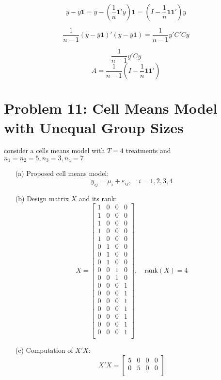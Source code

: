 \documentclass[10pt, oneside]{article}
\begin{document}
\[
	y - \bar{y}\mathbf{1} = y - \left( \frac{1}{n} \mathbf{1}'y \right)\mathbf{1} = \left( I - \frac{1}{n} \mathbf{1}\mathbf{1}' \right)y
\]

\[
	\frac{1}{n-1} (y - \bar{y}\mathbf{1})'(y - \bar{y}\mathbf{1}) = \frac{1}{n-1} y' C'C y
\]

\[
	\frac{1}{n-1} y' C y
\]
\[
	A = \frac{1}{n-1} \left( I - \frac{1}{n} \mathbf{1}\mathbf{1}' \right)
\]

\section*{Problem 11: Cell Means Model with Unequal Group Sizes}
consider a cells means model with $T=4$ treatments and $n_1=n_2=5,n_3=3,n_4=7$
\begin{itemize}
	\item[(a)] Proposed cell means model:
	      \[
		      y_{ij} = \mu_i + \varepsilon_{ij}, \quad i = 1, 2, 3, 4
	      \]
	\item[(b)] Design matrix $X$ and its rank:
	      \[
		      X = \begin{bmatrix}
			      1 & 0 & 0 & 0 \\
			      1 & 0 & 0 & 0 \\
			      1 & 0 & 0 & 0 \\
			      1 & 0 & 0 & 0 \\
			      1 & 0 & 0 & 0 \\
			      0 & 1 & 0 & 0 \\
			      0 & 1 & 0 & 0 \\
			      0 & 1 & 0 & 0 \\
			      0 & 0 & 1 & 0 \\
			      0 & 0 & 1 & 0 \\
			      0 & 0 & 0 & 1 \\
			      0 & 0 & 0 & 1 \\
			      0 & 0 & 0 & 1 \\
			      0 & 0 & 0 & 1 \\
			      0 & 0 & 0 & 1 \\
			      0 & 0 & 0 & 1 \\
			      0 & 0 & 0 & 1 \\
		      \end{bmatrix}, \quad \text{rank}(X) = 4
	      \]
	\item[(c)] Computation of $X'X$:
	      \[
		      X'X = \begin{bmatrix}
			      5 & 0 & 0 & 0 \\
			      0 & 5 & 0 & 0 \\

\end{bmatrix}\]
\end{itemize}
\end{document}
